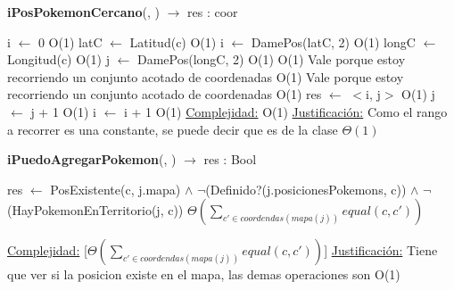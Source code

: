 \begin{algorithm}[H]{\textbf{iPosPokemonCercano}(, )  $\to$ res : coor} 
	{}
	\begin{algorithmic}
		\State i $\gets$ 0 \Comment O(1)
		\State latC $\gets$ Latitud(c)	\Comment O(1)
		\State i $\gets$ DamePos(latC, 2) \Comment O(1)		
		\State longC $\gets$ Longitud(c)	\Comment O(1)
		\State j $\gets$ DamePos(longC, 2) \Comment O(1)
			\Comment O(1) {Vale porque estoy recorriendo un conjunto acotado de coordenadas}
				\Comment O(1) {Vale porque estoy recorriendo un conjunto acotado de coordenadas}
					\Comment O(1)
					\State res $\gets$ $<$i, j$>$	\Comment O(1) 
				\EndIf
				\State j $\gets$ j + 1	\Comment O(1)
			\EndWhile
			\State i $\gets$ i + 1	\Comment O(1)
		\EndWhile
		\medskip
		\Statex \underline{Complejidad:} O(1)
		\Statex \underline{Justificación:} Como el rango a recorrer es una constante, se puede decir que es de la clase $\Theta(1)$ 
    \end{algorithmic}
\end{algorithm}

\begin{algorithm}[H]{\textbf{iPuedoAgregarPokemon}(, ) $\to$ res : Bool} 
	\begin{algorithmic}
		\State res $\gets$ PosExistente(c, j.mapa) $\land$ $\lnot$(Definido?(j.posicionesPokemons, c)) $\land$ $\lnot$(HayPokemonEnTerritorio(j, c))  \Comment $\Theta\left(\displaystyle\sum_{c' \in coordendas(mapa(j))}equal(c,c')\right)$
	
		\medskip
		\Statex \underline{Complejidad:} [$\Theta\left(\displaystyle\sum_{c' \in coordendas(mapa(j))}equal(c,c')\right)$]
		\Statex \underline{Justificación:} Tiene que ver si la posicion existe en el mapa, las demas operaciones son O(1)
     \end{algorithmic}
 \end{algorithm}
 
